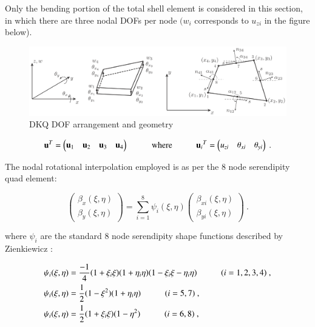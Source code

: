 Only the bending portion of the total shell element is considered in this section, in which there are three nodal DOFs per node $(w_i$ corresponds to $u_{zi}$ in the figure below).

\begin{figure}[H]
	\centering
	\def\svgwidth{\columnwidth}
	\includegraphics[width=14cm]{images/8nodeseren.png}
	\caption{DKQ DOF arrangement and geometry \cite{Bar12}}
	\label{8nodeseren}
\end{figure}

\begin{equation} 
\mathbf{u}^T = 
\begin{pmatrix}
\mathbf{u}_1 & \mathbf{u}_2 & \mathbf{u}_3 & \mathbf{u}_4
\end{pmatrix} 
\hspace{10mm}
\text{where}
\hspace{10mm}
\mathbf{u}{_i}^T = 
\begin{pmatrix}
{u_{zi}} & {\theta_{xi}} & {\theta_{yi}}
\end{pmatrix}
\label{equationBending}\ .
\end{equation}

The nodal rotational interpolation employed is as per the 8 node serendipity quad element:

\begin{equation} 
\begin{pmatrix}
\beta_x (\xi , \eta) \\
\beta_y (\xi , \eta)
\end{pmatrix}
= \sum_{i=1}^8 \psi_i (\xi , \eta) 
\begin{pmatrix}
\beta_{xi} (\xi , \eta) \\
\beta_{yi} (\xi , \eta)
\end{pmatrix}
\label{equation20}\ .
\end{equation}

where $\psi_i$ are the standard 8 node serendipity shape functions described by Zienkiewicz \cite{Zie77}:

\begin{gather} 
	\begin{aligned}
		&\psi_i (\xi , \eta) = \frac{-1}{4} (1 + \xi_i \xi)(1 + \eta_i \eta)(1 - \xi_i \xi - \eta_i \eta)
		\hspace{10mm}
		(i = 1, 2, 3, 4)\ , \\
		&\psi_i (\xi , \eta) = \frac{1}{2} (1 - \xi^2)(1 + \eta_i \eta)
		\hspace{10mm}
		(i = 5, 7)\ , \\
		&\psi_i (\xi , \eta) = \frac{1}{2} (1 + \xi_i \xi)(1 - \eta^2)
		\hspace{10mm}
		(i = 6, 8)
		\label{equation21}\ ,
	\end{aligned}
\end{gather}

